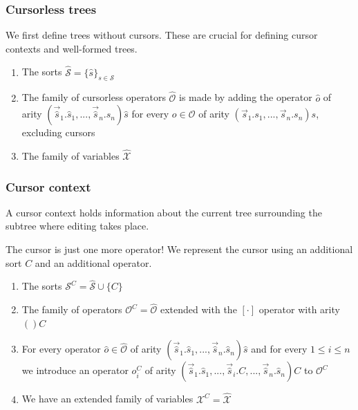 \documentclass[t,24pt,serif,aspectratio=169]{beamer}
\begin{document}
\begin{frame}
    \frametitle{Cursorless trees}

    We first define trees without cursors. These are crucial for
    defining cursor contexts and well-formed trees. 

    \begin{enumerate}
        \item The sorts $\hat{\mathcal{S}} = \{ \hat{s} \}_{s \in \mathcal{S}}$
        \item The family of cursorless operators $\hat{\mathcal{O}}$ is made by adding
              the operator $\hat{o}$ of arity
              $(\vec{\hat{s}}_1.\hat{s}_1,...,\vec{\hat{s}}_n.\hat{s}_n)\hat{s}$
              for every $o \in \mathcal{O}$ of arity $(\vec{s}_1.s_1,...,\vec{s}_n.s_n)s$, excluding cursors
        \item The family of variables $\hat{\mathcal{X}}$
    \end{enumerate}
\end{frame}

\begin{frame}
    \frametitle{Cursor context}

    A cursor context holds information about the current tree
    surrounding the subtree where editing takes place.

    The cursor is just one more operator! We represent the cursor
    using an additional sort $C$ and an additional operator.
    
    \begin{enumerate}
        \item The sorts $\mathcal{S}^C = \hat{\mathcal{S}} \cup \{C\}$
        \item The family of operators $\mathcal{O}^C = \hat{\mathcal{O}}$ extended with the $[\cdot]$ operator with arity $()C$
        \item For every operator $\hat{o} \in \hat{\mathcal{O}}$ of
          arity
          $(\vec{\hat{s}}_1.\hat{s}_1,...,\vec{\hat{s}}_n.\hat{s}_n)\hat{s}$
          and for every $1 \leq i \leq n$ we introduce an operator $o_i^C$ of arity $(\vec{\hat{s}}_1.\hat{s}_1,...,\vec{\hat{s}}_i.C,...,\vec{\hat{s}}_n.\hat{s}_n)C$ to $\mathcal{O}^C$
        \item We have an extended family of variables $\mathcal{X}^C = \hat{\mathcal{X}}$
    \end{enumerate}
\end{frame}
\end{document}
